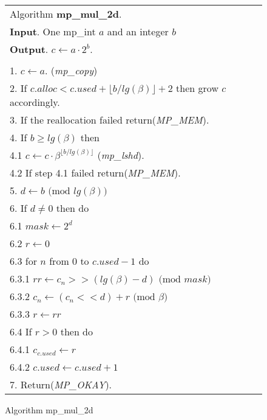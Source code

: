\documentclass[b5paper]{book}
\begin{document}
\newpage\begin{figure}[!here]
\begin{small}
\begin{center}
\begin{tabular}{l}
\hline Algorithm \textbf{mp\_mul\_2d}. \\
\textbf{Input}.   One mp\_int $a$ and an integer $b$ \\
\textbf{Output}.  $c \leftarrow a \cdot 2^b$. \\
\hline \\
1.  $c \leftarrow a$.  (\textit{mp\_copy}) \\
2.  If $c.alloc < c.used + \lfloor b / lg(\beta) \rfloor + 2$ then grow $c$ accordingly. \\
3.  If the reallocation failed return(\textit{MP\_MEM}). \\
4.  If $b \ge lg(\beta)$ then \\
\hspace{3mm}4.1  $c \leftarrow c \cdot \beta^{\lfloor b / lg(\beta) \rfloor}$ (\textit{mp\_lshd}). \\
\hspace{3mm}4.2  If step 4.1 failed return(\textit{MP\_MEM}). \\
5.  $d \leftarrow b \mbox{ (mod }lg(\beta)\mbox{)}$ \\
6.  If $d \ne 0$ then do \\
\hspace{3mm}6.1  $mask \leftarrow 2^d$ \\
\hspace{3mm}6.2  $r \leftarrow 0$ \\
\hspace{3mm}6.3  for $n$ from $0$ to $c.used - 1$ do \\
\hspace{6mm}6.3.1  $rr \leftarrow c_n >> (lg(\beta) - d) \mbox{ (mod }mask\mbox{)}$ \\
\hspace{6mm}6.3.2  $c_n \leftarrow (c_n << d) + r \mbox{ (mod }\beta\mbox{)}$ \\
\hspace{6mm}6.3.3  $r \leftarrow rr$ \\
\hspace{3mm}6.4  If $r > 0$ then do \\
\hspace{6mm}6.4.1  $c_{c.used} \leftarrow r$ \\
\hspace{6mm}6.4.2  $c.used \leftarrow c.used + 1$ \\
7.  Return(\textit{MP\_OKAY}). \\
\hline
\end{tabular}
\end{center}
\end{small}
\caption{Algorithm mp\_mul\_2d}
\end{figure}
\end{document}
